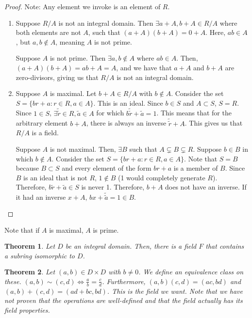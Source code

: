 \documentclass{article}
\theoremstyle{definition}
\theoremstyle{plain}
\newtheorem{theorem}{Theorem}
\theoremstyle{corollary}
\theoremstyle{lemma}
\begin{document}
\begin{proof}
    Note: Any element we invoke is an element of $R$.
    \begin{enumerate}
        \item Suppose $R/A$ is not an integral domain. Then $\exists a+A,b+A\in R/A$ where both elements are not $A$, such that $(a+A)(b+A)=0+A$. Here, $ab\in A$, but $a,b\notin A$, meaning $A$ is not prime.

        Suppose $A$ is not prime. Then $\exists a,b\notin A$ where $ab\in A$. Then, $(a+A)(b+A)=ab+A=A$, and we have that $a+A$ and $b+A$ are zero-divisors, giving us that $R/A$ is not an integral domain.
        
        \item Suppose $A$ is maximal. Let $b+A\in R/A$ with $b\notin A$. Consider the set $S=\{br+a:r\in R,a\in A\}$. This is an ideal. Since $b\in S$ and $A\subset S$, $S=R$. Since $1\in S$, $\exists\tilde{\tilde{r}}\in R,\tilde{a}\in A$ for which $b\tilde{\tilde{r}}+\tilde{a}=1$.  This means that for the arbitrary element $b+A$, there is always an inverse $\tilde{\tilde{r}}+A$. This gives us that $R/A$ is a field.

        Suppose $A$ is not maximal. Then, $\exists B$ such that $A\subsetneq B\subsetneq R$. Suppose $b\in B$ in which $b\notin A$. Consider the set $S=\{br+a:r\in R,a\in A\}$. Note that $S=B$ because $B\subset S$ and every element of the form $br+a$ is a member of $B$. Since $B$ is an ideal that is not $R$, $1\notin B$ (1 would completely generate $R$). Therefore, $b\tilde{r}+\tilde{a}\in S$ is never 1. Therefore, $b+A$ does not have an inverse. If it had an inverse $x+A$, $bx+\tilde{\tilde{a}}=1\in B$.
    \end{enumerate}
\end{proof}

Note that if $A$ is maximal, $A$ is prime. 

\begin{theorem}
    Let $D$ be an integral domain. Then, there is a field $F$ that contains a subring isomorphic to $D$.
\end{theorem}

\begin{theorem}
    Let $(a,b)\in D\times D$ with $b\neq0$. We define an equivalence class on these. $(a,b)\sim(c,d)\iff \frac a b=\frac c d$. Furthermore, $(a,b)(c,d)=(ac,bd)$ and $(a,b)+(c,d)=(ad+bc,bd)$. This is the field we want. Note that we have not proven that the operations are well-defined and that the field actually has its field properties.
\end{theorem}
\end{document}
